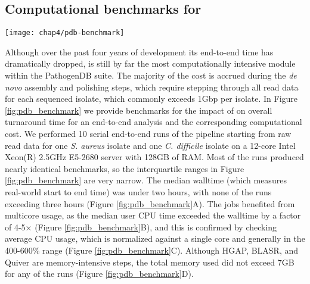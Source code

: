 \subsection{Computational benchmarks for \pathogendbpipeline}

\begin{figure*}[htb]
  \texttt{[image: chap4/pdb-benchmark]}               
  \caption[Boxplots of computational benchmarks for \pathogendbpipeline]{\textbf{Boxplots of computational benchmarks for \pathogendbpipeline{} on a \emph{S. aureus} and a \emph{C. difficile} isolate.} For each isolate, measurements were collected from 10 end-to-end serial runs of the pipeline, starting at raw read data and ending at the \texttt{prokka\textunderscore to\textunderscore igb} task, using a single server with a 12-core Intel Xeon(R) 2.5GHz E5-2680 CPU and 128GB of RAM.}
  \label{fig:pdb_benchmark}
\end{figure*}

Although over the past four years of development its end-to-end time has dramatically dropped, \pathogendbpipeline{} is still by far the most computationally intensive module within the PathogenDB suite. The majority of the cost is accrued during the \emph{de novo} assembly and polishing steps, which require stepping through all read data for each sequenced isolate, which commonly exceeds 1Gbp per isolate. In Figure \ref{fig:pdb_benchmark} we provide benchmarks for the impact of \pathogendbpipeline{} on overall turnaround time for an end-to-end analysis and the corresponding computational cost. We performed 10 serial end-to-end runs of the pipeline starting from raw read data for one \emph{S. aureus} isolate and one \emph{C. difficile} isolate on a 12-core Intel Xeon(R) 2.5GHz E5-2680 server with 128GB of RAM. Most of the runs produced nearly identical benchmarks, so the interquartile ranges in Figure \ref{fig:pdb_benchmark} are very narrow. The median walltime (which measures real-world start to end time) was under two hours, with none of the runs exceeding three hours (Figure \ref{fig:pdb_benchmark}A). The jobs benefited from multicore usage, as the median user CPU time exceeded the walltime by a factor of 4-5× (Figure \ref{fig:pdb_benchmark}B), and this is confirmed by checking average CPU usage, which is normalized against a single core and generally in the 400-600\% range (Figure \ref{fig:pdb_benchmark}C). Although HGAP, BLASR, and Quiver are memory-intensive steps, the total memory used did not exceed 7GB for any of the runs (Figure \ref{fig:pdb_benchmark}D).

